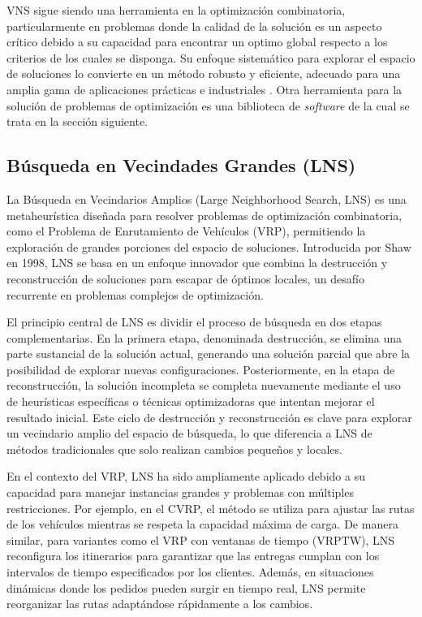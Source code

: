 \documentclass{article}
\begin{document}
VNS sigue siendo una herramienta en la optimización combinatoria, particularmente en problemas donde la calidad de la solución es un aspecto crítico debido a su capacidad para encontrar un optimo global respecto a los criterios de los cuales se disponga. Su enfoque sistemático para explorar el espacio de soluciones lo convierte en un método robusto y eficiente, adecuado para una amplia gama de aplicaciones prácticas e industriales \cite{ref12,ref13,ref14}. Otra herramienta para la solución de problemas de optimización es una  biblioteca de \textit{software} de la cual se trata en la sección siguiente.



\subsection{Búsqueda en Vecindades Grandes (LNS)}
La Búsqueda en Vecindarios Amplios (Large Neighborhood Search, LNS) es una metaheurística diseñada para resolver problemas de optimización combinatoria, como el Problema de Enrutamiento de Vehículos (VRP), permitiendo la exploración de grandes porciones del espacio de soluciones. Introducida por Shaw en 1998, LNS se basa en un enfoque innovador que combina la destrucción y reconstrucción de soluciones para escapar de óptimos locales, un desafío recurrente en problemas complejos de optimización.

El principio central de LNS es dividir el proceso de búsqueda en dos etapas complementarias. En la primera etapa, denominada destrucción, se elimina una parte sustancial de la solución actual, generando una solución parcial que abre la posibilidad de explorar nuevas configuraciones. Posteriormente, en la etapa de reconstrucción, la solución incompleta se completa nuevamente mediante el uso de heurísticas específicas o técnicas optimizadoras que intentan mejorar el resultado inicial. Este ciclo de destrucción y reconstrucción es clave para explorar un vecindario amplio del espacio de búsqueda, lo que diferencia a LNS de métodos tradicionales que solo realizan cambios pequeños y locales.

En el contexto del VRP, LNS ha sido ampliamente aplicado debido a su capacidad para manejar instancias grandes y problemas con múltiples restricciones. Por ejemplo, en el CVRP, el método se utiliza para ajustar las rutas de los vehículos mientras se respeta la capacidad máxima de carga. De manera similar, para variantes como el VRP con ventanas de tiempo (VRPTW), LNS reconfigura los itinerarios para garantizar que las entregas cumplan con los intervalos de tiempo especificados por los clientes. Además, en situaciones dinámicas donde los pedidos pueden surgir en tiempo real, LNS permite reorganizar las rutas adaptándose rápidamente a los cambios.
\end{document}
